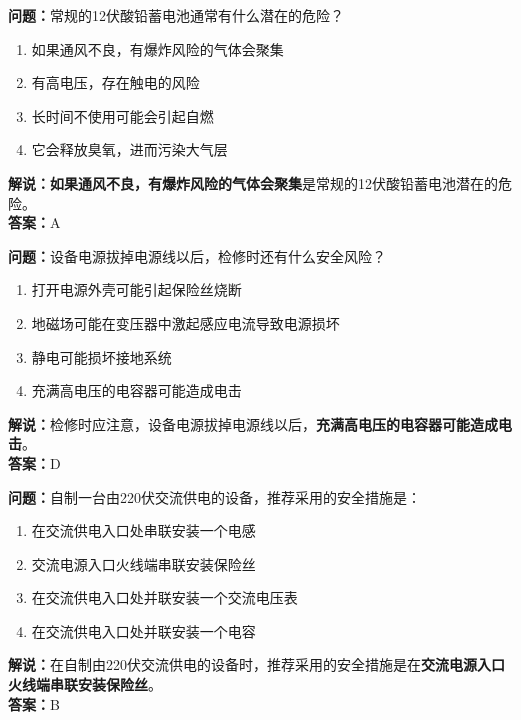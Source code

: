 \documentclass{ctexbook}
\begin{document}
\bigskip


\noindent\textbf{问题：}常规的12伏酸铅蓄电池通常有什么潜在的危险？
\begin{enumerate}[label=\Alph*), leftmargin=3em]
	\item 如果通风不良，有爆炸风险的气体会聚集
	\item 有高电压，存在触电的风险
	\item 长时间不使用可能会引起自燃
	\item 它会释放臭氧，进而污染大气层
\end{enumerate}
\noindent\textbf{解说：}\textbf{如果通风不良，有爆炸风险的气体会聚集}是常规的12伏酸铅蓄电池潜在的危险。\\\noindent\textbf{答案：}A

\bigskip


\noindent\textbf{问题：}设备电源拔掉电源线以后，检修时还有什么安全风险？
\begin{enumerate}[label=\Alph*), leftmargin=3em]
	\item 打开电源外壳可能引起保险丝烧断
	\item 地磁场可能在变压器中激起感应电流导致电源损坏
	\item 静电可能损坏接地系统
	\item 充满高电压的电容器可能造成电击
\end{enumerate}
\noindent\textbf{解说：}检修时应注意，设备电源拔掉电源线以后，\textbf{充满高电压的电容器可能造成电击}。\\\noindent\textbf{答案：}D

\bigskip


\noindent\textbf{问题：}自制一台由220伏交流供电的设备，推荐采用的安全措施是：
\begin{enumerate}[label=\Alph*), leftmargin=3em]
	\item 在交流供电入口处串联安装一个电感
	\item 交流电源入口火线端串联安装保险丝
	\item 在交流供电入口处并联安装一个交流电压表
	\item 在交流供电入口处并联安装一个电容
\end{enumerate}
\noindent\textbf{解说：}在自制由220伏交流供电的设备时，推荐采用的安全措施是在\textbf{交流电源入口火线端串联安装保险丝}。\\\noindent\textbf{答案：}B


\end{document}
